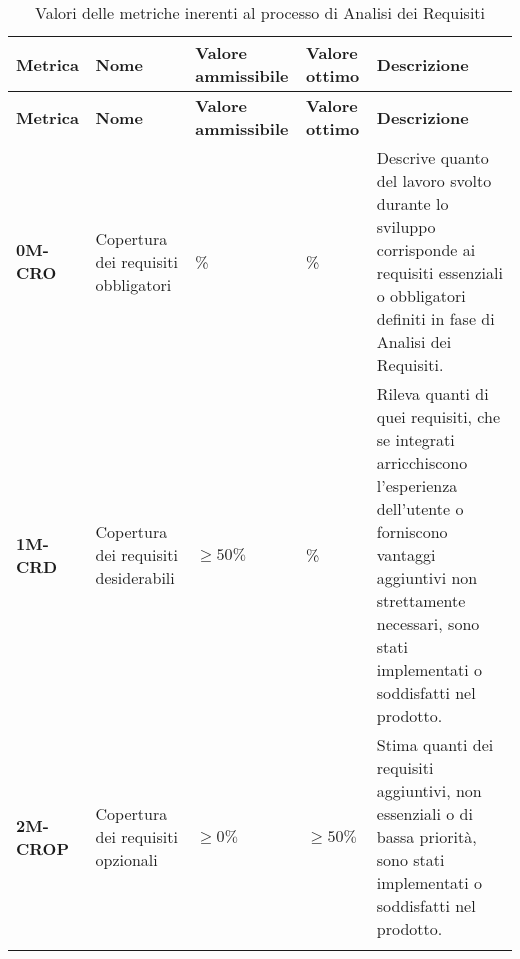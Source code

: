 \begin{longtable}{|>{\raggedright\arraybackslash}m{}|>{\raggedright\arraybackslash}m{}|>{\raggedright\arraybackslash}m{}|>{\raggedright\arraybackslash}m{}|>{\raggedright\arraybackslash}m{}|}
	\hline
	\textbf{Metrica} & \textbf{Nome}                        & \textbf{Valore ammissibile} & \textbf{Valore ottimo} & \textbf{Descrizione}                                                                                                                                                                                      \\
	\hline
	\endfirsthead
	\hline
	\textbf{Metrica} & \textbf{Nome}                        & \textbf{Valore ammissibile} & \textbf{Valore ottimo} & \textbf{Descrizione}                                                                                                                                                                                      \\
	\endhead
	\textbf{0M-CRO}  & Copertura dei requisiti obbligatori  & 100\%                       & 100\%                  & Descrive quanto del lavoro svolto durante lo sviluppo corrisponde ai requisiti essenziali o obbligatori definiti in fase di Analisi dei Requisiti.                                                        \\
	\hline
	\textbf{1M-CRD}  & Copertura dei requisiti desiderabili & $\geq 50\% $                & 100\%                  & Rileva quanti di quei requisiti, che se integrati arricchiscono l'esperienza dell'utente o forniscono vantaggi aggiuntivi non strettamente necessari, sono stati implementati o soddisfatti nel prodotto. \\
	\hline
	\textbf{2M-CROP} & Copertura dei requisiti opzionali    & $\geq 0\% $                 & $\geq 50\% $           & Stima quanti dei requisiti aggiuntivi, non essenziali o di bassa priorità, sono stati implementati o soddisfatti nel prodotto.                                                                            \\
	\hline
	\caption{ Valori delle metriche inerenti al processo di Analisi dei Requisiti}
	\label{table:1}
\end{longtable}

